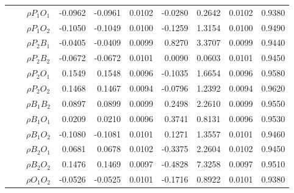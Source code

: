 \documentclass[letterpaper]{article}
\begin{document}
\begin{table}[h]
\begin{tabular}{cccrrrrrrr}
            &             & $\rho{P_1O_1}$ & -0.0962                & -0.0961                & 0.0102                 & -0.0280                & 0.2642                 & 0.0102                   & 0.9380                 \\
            &             & $\rho{P_1O_2}$ & -0.1050                & -0.1049                & 0.0100                 & -0.1259                & 1.3154                 & 0.0100                   & 0.9490                 \\
            &             & $\rho{P_2B_1}$ & -0.0405                & -0.0409                & 0.0099                 & 0.8270                 & 3.3707                 & 0.0099                   & 0.9440                 \\
            &             & $\rho{P_2B_2}$ & -0.0672                & -0.0672                & 0.0101                 & 0.0090                 & 0.0603                 & 0.0101                   & 0.9450                 \\
            &             & $\rho{P_2O_1}$ & 0.1549                 & 0.1548                 & 0.0096                 & -0.1035                & 1.6654                 & 0.0096                   & 0.9580                 \\
            &             & $\rho{P_2O_2}$ & 0.1468                 & 0.1467                 & 0.0094                 & -0.0796                & 1.2392                 & 0.0094                   & 0.9620                 \\
            &             & $\rho{B_1B_2}$ & 0.0897                 & 0.0899                 & 0.0099                 & 0.2498                 & 2.2610                 & 0.0099                   & 0.9550                 \\
            &             & $\rho{B_1O_1}$ & 0.0209                 & 0.0210                 & 0.0096                 & 0.3741                 & 0.8131                 & 0.0096                   & 0.9530                 \\
            &             & $\rho{B_1O_2}$ & -0.1080                & -0.1081                & 0.0101                 & 0.1271                 & 1.3557                 & 0.0101                   & 0.9460                 \\
            &             & $\rho{B_2O_1}$ & 0.0681                 & 0.0678                 & 0.0102                 & -0.3375                & 2.2604                 & 0.0102                   & 0.9450                 \\
            &             & $\rho{B_2O_2}$ & 0.1476                 & 0.1469                 & 0.0097                 & -0.4828                & 7.3258                 & 0.0097                   & 0.9510                 \\
            &             & $\rho{O_1O_2}$ & -0.0526                & -0.0525                & 0.0101                 & -0.1716                & 0.8922                 & 0.0101                   & 0.9380                 \\  \hline
\end{tabular}
\end{table}
\end{document}

